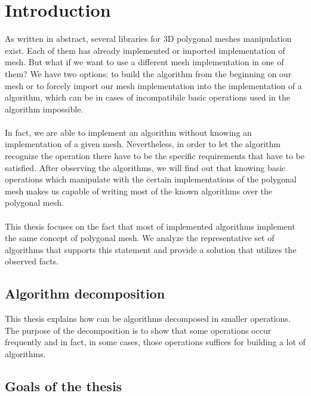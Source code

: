 \chapter*{Introduction}

As written in abstract, several libraries for 3D polygonal meshes manipulation exist.
Each of them has already implemented or imported implementation of mesh. But what if we want to use
a different mesh implementation in one of them? We have two options: to build
the algorithm from the beginning on our mesh or to forcely import our mesh implementation into
the implementation of a algorithm, which can be in cases of incompatibile basic operations
used in the algorithm impossible.\\
\\
In fact, we are able to implement an algorithm without knowing an implementation of
a given mesh. Nevertheless, in order to let the algorithm recognize the operation there
have to be the specific requirements that have to be satisfied.
After observing the algorithms, we will find out that
knowing basic operations which manipulate with the certain implementations of the polygonal mesh
makes us capable of writing most of the known algorithms over the polygonal mesh.\\
\\
This thesis focuses on the fact that most of implemented algorithms implement the
same concept of polygonal mesh. We analyze the representative set of algorithms that
supports this statement and provide a solution that utilizes the observed facts.

\section*{Algorithm decomposition}

This thesis explains how can be algorithms decomposed in smaller operations.
The purpose of the decomposition is to show that some operations occur frequently
and in fact, in some cases, those operations suffices for building a lot of algorithms.

\section*{Goals of the thesis}

